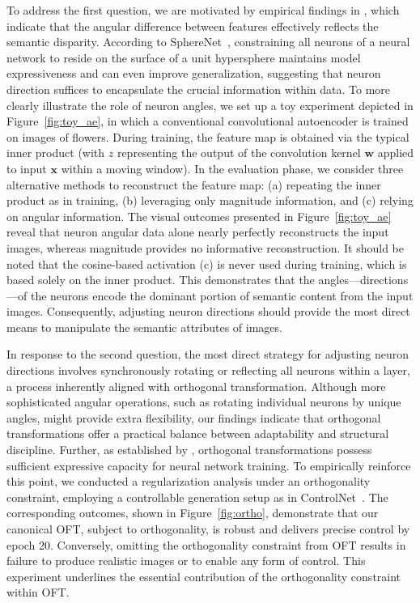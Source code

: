 To address the first question, we are motivated by empirical findings in \cite{liu2018decoupled,chen2020angular}, which indicate that the angular difference between features effectively reflects the semantic disparity. According to SphereNet~\cite{liu2017deep}, constraining all neurons of a neural network to reside on the surface of a unit hypersphere maintains model expressiveness and can even improve generalization, suggesting that neuron direction suffices to encapsulate the crucial information within data. To more clearly illustrate the role of neuron angles, we set up a toy experiment depicted in Figure~\ref{fig:toy_ae}, in which a conventional convolutional autoencoder is trained on images of flowers. During training, the feature map is obtained via the typical inner product (with $z$ representing the output of the convolution kernel $\bm{w}$ applied to input $\bm{x}$ within a moving window). In the evaluation phase, we consider three alternative methods to reconstruct the feature map: (a) repeating the inner product as in training, (b) leveraging only magnitude information, and (c) relying on angular information. The visual outcomes presented in Figure~\ref{fig:toy_ae} reveal that neuron angular data alone nearly perfectly reconstructs the input images, whereas magnitude provides no informative reconstruction. It should be noted that the cosine-based activation (c) is never used during training, which is based solely on the inner product. This demonstrates that the angles—directions—of the neurons encode the dominant portion of semantic content from the input images. Consequently, adjusting neuron directions should provide the most direct means to manipulate the semantic attributes of images.

In response to the second question, the most direct strategy for adjusting neuron directions involves synchronously rotating or reflecting all neurons within a layer, a process inherently aligned with orthogonal transformation. Although more sophisticated angular operations, such as rotating individual neurons by unique angles, might provide extra flexibility, our findings indicate that orthogonal transformations offer a practical balance between adaptability and structural discipline. Further, as established by \cite{liu2021orthogonal}, orthogonal transformations possess sufficient expressive capacity for neural network training. To empirically reinforce this point, we conducted a regularization analysis under an orthogonality constraint, employing a controllable generation setup as in ControlNet~\cite{zhang2023adding}. The corresponding outcomes, shown in Figure~\ref{fig:ortho}, demonstrate that our canonical OFT, subject to orthogonality, is robust and delivers precise control by epoch 20. Conversely, omitting the orthogonality constraint from OFT results in failure to produce realistic images or to enable any form of control. This experiment underlines the essential contribution of the orthogonality constraint within OFT.

